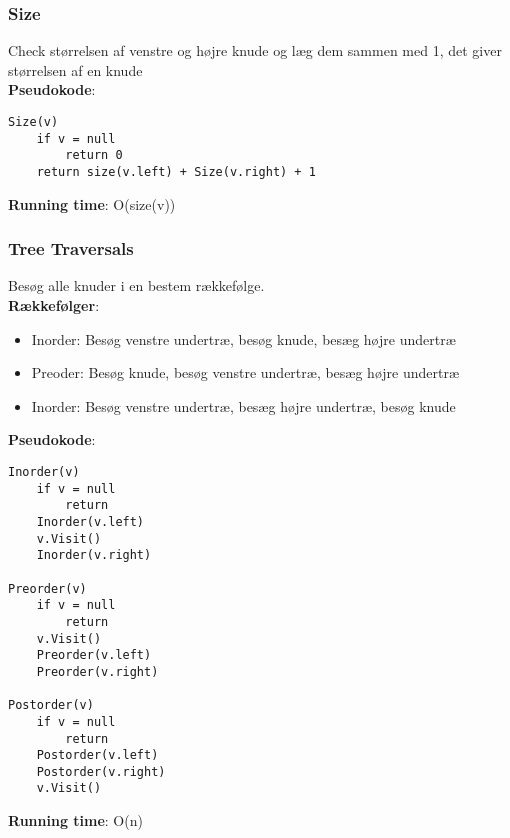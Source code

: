 \subsubsection{Size}
Check størrelsen af venstre og højre knude og læg dem sammen med 1, det giver størrelsen af en knude\\
\textbf{Pseudokode}:
\begin{lstlisting}[frame=single, mathescape=true]
Size(v)
	if v = null
		return 0
	return size(v.left) + Size(v.right) + 1
\end{lstlisting}
\textbf{Running time}: O(size(v))

\subsubsection{Tree Traversals}
Besøg alle knuder i en bestem rækkefølge.\\
\textbf{Rækkefølger}:
\begin{itemize}
	\item Inorder: Besøg venstre undertræ, besøg knude, besæg højre undertræ
	\item Preoder: Besøg knude, besøg venstre undertræ, besæg højre undertræ
	\item Inorder: Besøg venstre undertræ, besæg højre undertræ, besøg knude
\end{itemize}
\textbf{Pseudokode}:
\begin{lstlisting}[frame=single, mathescape=true]
Inorder(v)
	if v = null
		return
	Inorder(v.left)
	v.Visit()
	Inorder(v.right)

Preorder(v)
	if v = null
		return
	v.Visit()
	Preorder(v.left)
	Preorder(v.right)

Postorder(v)
	if v = null
		return
	Postorder(v.left)
	Postorder(v.right)
	v.Visit()
\end{lstlisting}
\textbf{Running time}: O(n)